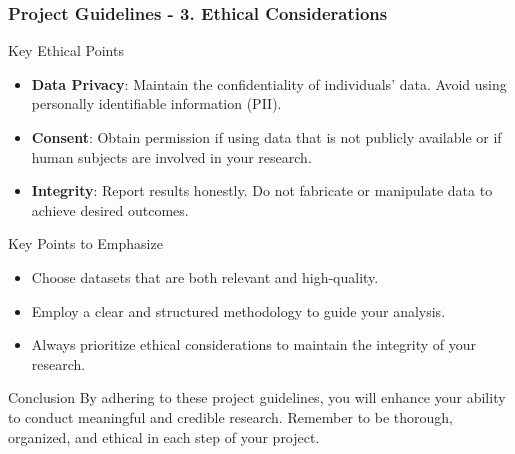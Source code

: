 \documentclass{beamer}
\begin{document}
\begin{frame}[fragile]
    \frametitle{Project Guidelines - 3. Ethical Considerations}
    \begin{block}{Key Ethical Points}
        \begin{itemize}
            \item \textbf{Data Privacy}: Maintain the confidentiality of individuals' data. Avoid using personally identifiable information (PII).
            \item \textbf{Consent}: Obtain permission if using data that is not publicly available or if human subjects are involved in your research.
            \item \textbf{Integrity}: Report results honestly. Do not fabricate or manipulate data to achieve desired outcomes.
        \end{itemize}
    \end{block}

    \begin{block}{Key Points to Emphasize}
        \begin{itemize}
            \item Choose datasets that are both relevant and high-quality.
            \item Employ a clear and structured methodology to guide your analysis.
            \item Always prioritize ethical considerations to maintain the integrity of your research.
        \end{itemize}
    \end{block}
    
    \begin{block}{Conclusion}
        By adhering to these project guidelines, you will enhance your ability to conduct meaningful and credible research. Remember to be thorough, organized, and ethical in each step of your project.
    \end{block}
\end{frame}
\end{document}
